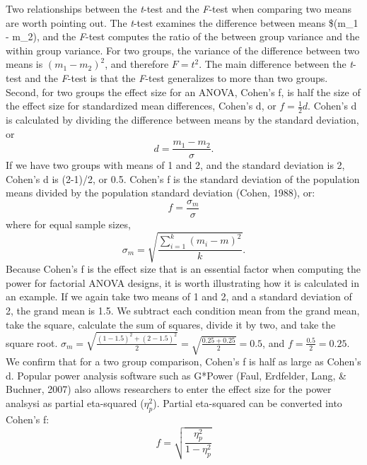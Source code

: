 \documentclass[,jou, draftfirst, a4paper,floatsintext]{apa6}
\begin{document}
Two relationships between the \emph{t}-test and the \emph{F}-test when comparing two means are worth pointing out.
The \emph{t}-test examines the difference between means \$(m\_1 - m\_2), and the \emph{F}-test computes the ratio of the between group variance and the within group variance.
For two groups, the variance of the difference between two means is \((m_1 - m_2)^2\), and therefore \(F = t^2\).
The main difference between the \emph{t}-test and the \emph{F}-test is that the \emph{F}-test generalizes to more than two groups.
Second, for two groups the effect size for an ANOVA, Cohen's f, is half the size of the effect size for standardized mean differences, Cohen's d, or \(f = \frac{1}{2}d\).
Cohen's d is calculated by dividing the difference between means by the standard deviation, or
\begin{equation}
d = \frac{m_1-m_2}{\sigma}.
\end{equation}
If we have two groups with means of 1 and 2, and the standard deviation is 2, Cohen's d is (2-1)/2, or 0.5.
Cohen's f is the standard deviation of the population means divided by the population standard deviation (Cohen, 1988), or:
\begin{equation}
f = \frac{\sigma _{ m }}{\sigma}
\end{equation}
where for equal sample sizes,
\begin{equation}
\sigma _{ m } = \sqrt { \frac { \sum_ { i = 1 } ^ { k } ( m _ { i } - m ) ^ { 2 } } { k } }.
\end{equation}
Because Cohen's f is the effect size that is an essential factor when computing the power for factorial ANOVA designs, it is worth illustrating how it is calculated in an example.
If we again take two means of 1 and 2, and a standard deviation of 2, the grand mean is 1.5.
We subtract each condition mean from the grand mean, take the square, calculate the sum of squares, divide it by two, and take the square root.
\(\sigma_m = \sqrt{\frac{(1-1.5)^2+(2-1.5)^2}{2}} = \sqrt{\frac{0.25+0.25}{2}} = 0.5\), and \(f = \frac{0.5}{2} = 0.25.\)
We confirm that for a two group comparison, Cohen's f is half as large as Cohen's d.
Popular power analysis software such as G*Power (Faul, Erdfelder, Lang, \& Buchner, 2007) also allows researchers to enter the effect size for the power analsysi as partial eta-squared (\(\eta_p^2\)).
Partial eta-squared can be converted into Cohen's f:
\begin{equation}
f = \sqrt{\frac{\eta_p^2}{1-\eta_p^2}} \label{eq:eta-to-f}
\end{equation}
\end{document}
